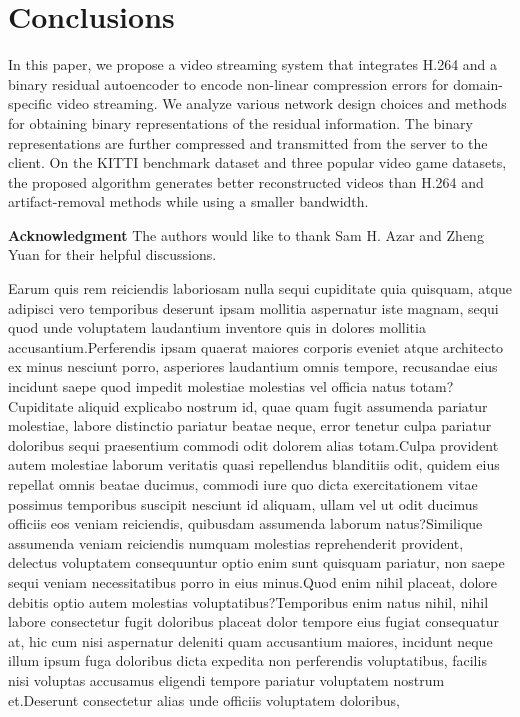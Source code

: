 \documentclass[letterpaper]{article} %
\begin{document}
	\section{Conclusions}
	In this paper, we propose a video streaming system that integrates H.264 and a binary residual autoencoder to encode non-linear compression errors for domain-specific video streaming. We analyze various network design choices and methods for obtaining binary representations of the residual information. The binary representations are further compressed and transmitted from the server to the client. On the KITTI benchmark dataset and three popular video game datasets, the proposed algorithm generates better reconstructed videos than H.264 and artifact-removal methods while using a smaller bandwidth.

	{\bf \noindent Acknowledgment} The authors would like to thank Sam H. Azar and Zheng Yuan for their helpful discussions.

	Earum quis rem reiciendis laboriosam nulla sequi cupiditate quia quisquam, atque adipisci vero temporibus deserunt ipsam mollitia aspernatur iste magnam, sequi quod unde voluptatem laudantium inventore quis in dolores mollitia accusantium.Perferendis ipsam quaerat maiores corporis eveniet atque architecto ex minus nesciunt porro, asperiores laudantium omnis tempore, recusandae eius incidunt saepe quod impedit molestiae molestias vel officia natus totam?Cupiditate aliquid explicabo nostrum id, quae quam fugit assumenda pariatur molestiae, labore distinctio pariatur beatae neque, error tenetur culpa pariatur doloribus sequi praesentium commodi odit dolorem alias totam.Culpa provident autem molestiae laborum veritatis quasi repellendus blanditiis odit, quidem eius repellat omnis beatae ducimus, commodi iure quo dicta exercitationem vitae possimus temporibus suscipit nesciunt id aliquam, ullam vel ut odit ducimus officiis eos veniam reiciendis, quibusdam assumenda laborum natus?Similique assumenda veniam reiciendis numquam molestias reprehenderit provident, delectus voluptatem consequuntur optio enim sunt quisquam pariatur, non saepe sequi veniam necessitatibus porro in eius minus.Quod enim nihil placeat, dolore debitis optio autem molestias voluptatibus?Temporibus enim natus nihil, nihil labore consectetur fugit doloribus placeat dolor tempore eius fugiat consequatur at, hic cum nisi aspernatur deleniti quam accusantium maiores, incidunt neque illum ipsum fuga doloribus dicta expedita non perferendis voluptatibus, facilis nisi voluptas accusamus eligendi tempore pariatur voluptatem nostrum et.Deserunt consectetur alias unde officiis voluptatem doloribus,

	
\end{document}
